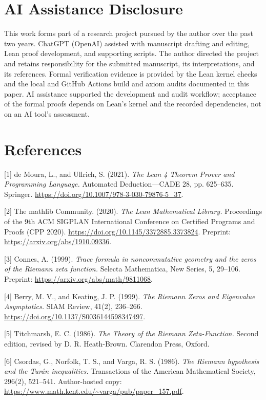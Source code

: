 \documentclass[
  11pt,
]{article}
\begin{document}
\hypertarget{ai-assistance-disclosure}{%
\section{AI Assistance Disclosure}\label{ai-assistance-disclosure}}

This work forms part of a research project pursued by the author over the past two years. ChatGPT (OpenAI) assisted with manuscript drafting and editing, Lean proof development, and supporting scripts. The author directed the project and retains responsibility for the submitted manuscript, its interpretations, and its references. Formal verification evidence is provided by the Lean kernel checks and the local and GitHub Actions build and axiom audits documented in this paper. AI assistance supported the development and audit workflow; acceptance of the formal proofs depends on Lean's kernel and the recorded dependencies, not on an AI tool's assessment.

\hypertarget{references}{%
\section{References}\label{references}}

{[}1{]} de Moura, L., and Ullrich, S. (2021). \emph{The Lean 4 Theorem Prover and Programming Language.} Automated Deduction---CADE 28, pp. 625--635. Springer. \url{https://doi.org/10.1007/978-3-030-79876-5_37}.

{[}2{]} The mathlib Community. (2020). \emph{The Lean Mathematical Library.} Proceedings of the 9th ACM SIGPLAN International Conference on Certified Programs and Proofs (CPP 2020). \url{https://doi.org/10.1145/3372885.3373824}. Preprint: \url{https://arxiv.org/abs/1910.09336}.

{[}3{]} Connes, A. (1999). \emph{Trace formula in noncommutative geometry and the zeros of the Riemann zeta function.} Selecta Mathematica, New Series, 5, 29--106. Preprint: \url{https://arxiv.org/abs/math/9811068}.

{[}4{]} Berry, M. V., and Keating, J. P. (1999). \emph{The Riemann Zeros and Eigenvalue Asymptotics.} SIAM Review, 41(2), 236--266. \url{https://doi.org/10.1137/S0036144598347497}.

{[}5{]} Titchmarsh, E. C. (1986). \emph{The Theory of the Riemann Zeta-Function.} Second edition, revised by D. R. Heath-Brown. Clarendon Press, Oxford.

{[}6{]} Csordas, G., Norfolk, T. S., and Varga, R. S. (1986). \emph{The Riemann hypothesis and the Turán inequalities.} Transactions of the American Mathematical Society, 296(2), 521--541. Author-hosted copy: \url{https://www.math.kent.edu/~varga/pub/paper_157.pdf}.
\end{document}
